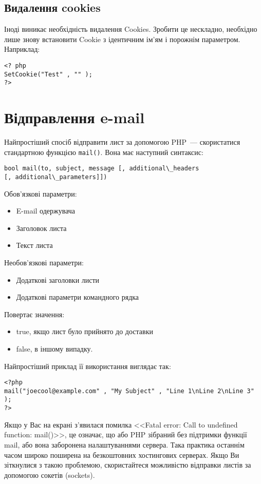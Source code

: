 \subsection*{Видалення cookies}

Іноді виникає необхідність видалення Cookies. Зробити це нескладно, необхідно лише знову встановити Cookie з ідентичним ім'ям і порожнім параметром. Наприклад:
\begin{verbatim}
<? php
SetCookie("Test" , "" );
?> 
\end{verbatim}


\section{Відправлення e-mail}
Найпростіший спосіб відправити лист за допомогою PHP~--- скористатися стандартною функцією \verb'mail()'. Вона має наступний синтаксис:
\begin{verbatim}
bool mail(to, subject, message [, additional\_headers 
[, additional\_parameters]])
\end{verbatim}

Обов'язкові параметри:
\begin{itemize}
\item E-mail одержувача
\item Заголовок листа
\item Текст листа 
\end{itemize}

Необов'язкові параметри:
\begin{itemize}
\item Додаткові заголовки листи
\item Додаткові параметри командного рядка 
\end{itemize}
Повертає значення:
\begin{itemize}
\item true, якщо лист було прийнято до доставки
\item false, в іншому випадку. 
\end{itemize}
Найпростіший приклад її використання виглядає так:
\begin{verbatim}
<?php
mail("joecool@example.com" , "My Subject" , "Line 1\nLine 2\nLine 3" );
?>
\end{verbatim}
Якщо у Вас на екрані з'явилася помилка <<Fatal error: Call to undefined function: mail()>>, це означає, що або PHP зібраний без підтримки функції mail, або вона заборонена налаштуваннями сервера. Така практика останнім часом широко поширена на безкоштовних хостингових серверах. Якщо Ви зіткнулися з такою проблемою, скористайтеся можливістю відправки листів за допомогою сокетів (sockets). 


